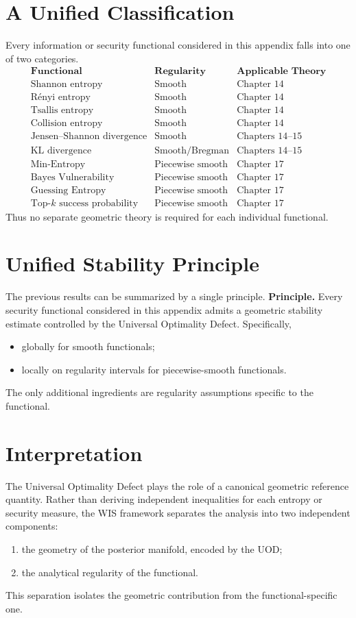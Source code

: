 \section{A Unified Classification}
Every information or security functional considered in this appendix
falls into one of two categories.
\[
\begin{array}{lll}
\textbf{Functional} & \textbf{Regularity} & \textbf{Applicable Theory} \\
\hline
\text{Shannon entropy} & \text{Smooth} & \text{Chapter 14} \\
\text{R\'enyi entropy} & \text{Smooth} & \text{Chapter 14} \\
\text{Tsallis entropy} & \text{Smooth} & \text{Chapter 14} \\
\text{Collision entropy} & \text{Smooth} & \text{Chapter 14} \\
\text{Jensen--Shannon divergence} & \text{Smooth} & \text{Chapters 14--15} \\
\text{KL divergence} & \text{Smooth/Bregman} & \text{Chapters 14--15} \\
\text{Min-Entropy} & \text{Piecewise smooth} & \text{Chapter 17} \\
\text{Bayes Vulnerability} & \text{Piecewise smooth} & \text{Chapter 17} \\
\text{Guessing Entropy} & \text{Piecewise smooth} & \text{Chapter 17} \\
\text{Top-\(k\) success probability} & \text{Piecewise smooth} & \text{Chapter 17}
\end{array}
\]
Thus no separate geometric theory is required for each individual
functional.
\section{Unified Stability Principle}
The previous results can be summarized by a single principle.
\textbf{Principle.}
Every security functional considered in this appendix admits a geometric
stability estimate controlled by the Universal Optimality Defect.
Specifically,
\begin{itemize}
\item globally for smooth functionals;
\item locally on regularity intervals for piecewise-smooth functionals.
\end{itemize}
The only additional ingredients are regularity assumptions specific to
the functional.
\section{Interpretation}
The Universal Optimality Defect plays the role of a canonical geometric
reference quantity.
Rather than deriving independent inequalities for each entropy or
security measure, the WIS framework separates the analysis into two
independent components:
\begin{enumerate}
\item the geometry of the posterior manifold, encoded by the UOD;
\item the analytical regularity of the functional.
\end{enumerate}
This separation isolates the geometric contribution from the
functional-specific one.
